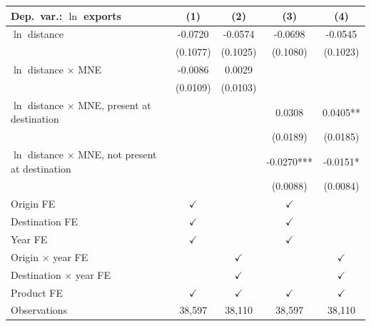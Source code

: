 \begin{tabular}{lcccc} \hline
Dep.\ var.: $\ln$ exports & (1) & (2) & (3) & (4) \\ \hline
$\ln$ distance & -0.0720 & -0.0574 & -0.0698 & -0.0545 \\
 & (0.1077) & (0.1025) & (0.1080) & (0.1023) \\
$\ln$ distance $\times$ MNE & -0.0086 & 0.0029 &  &  \\
 & (0.0109) & (0.0103) &  &  \\
$\ln$ distance $\times$ MNE, present at destination &  &  & 0.0308 & 0.0405** \\
 &  &  & (0.0189) & (0.0185) \\
$\ln$ distance $\times$ MNE, not present at destination &  &  & -0.0270*** & -0.0151* \\
 &  &  & (0.0088) & (0.0084) \\
\hline
Origin FE & $\checkmark$ &  & $\checkmark$ &  \\
Destination FE & $\checkmark$ &  & $\checkmark$ &  \\
Year FE & $\checkmark$ &  & $\checkmark$ &  \\
Origin $\times$ year FE &  & $\checkmark$ &  & $\checkmark$ \\
Destination $\times$ year FE &  & $\checkmark$ &  & $\checkmark$ \\
Product FE & $\checkmark$ & $\checkmark$ & $\checkmark$ & $\checkmark$ \\
\hline
Observations & 38,597 & 38,110 & 38,597 & 38,110 \\
\hline
\end{tabular}
